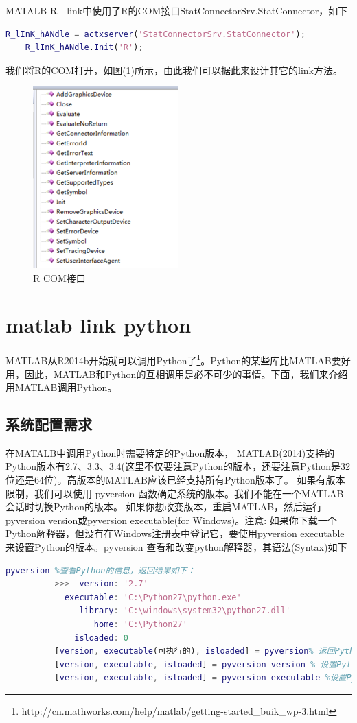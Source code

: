     MATALB R - link中使用了R的COM接口StatConnectorSrv.StatConnector，如下
    \begin{lstlisting}[language = Matlab]
    R_lInK_hANdle = actxserver('StatConnectorSrv.StatConnector');
    R_lInK_hANdle.Init('R');
    \end{lstlisting}
    我们将R的COM打开，如图(\ref{MATLAB-R接口})所示，由此我们可以据此来设计其它的link方法。
    \begin{figure}[H]
    \centering
    \includegraphics[height = 7cm]{images/MATLAB-Rjiekou.png}
    \caption{R COM接口}
    \label{MATLAB-R接口}
    \end{figure}

\section{matlab link python}
    \par
    MATLAB从R2014b开始就可以调用Python了\footnote{http://cn.mathworks.com/help/matlab/getting-started\_buik\_wp-3.html}。Python的某些库比MATLAB要好用，因此，MATLAB和Python的互相调用是必不可少的事情。下面，我们来介绍用MATLAB调用Python。
    \subsection{系统配置需求}
        \par
        在MATALB中调用Python时需要特定的Python版本， MATLAB(2014)支持的Python版本有2.7、3.3、3.4(这里不仅要注意Python的版本，还要注意Python是32位还是64位)。高版本的MATLAB应该已经支持所有Python版本了。 如果有版本限制，我们可以使用 pyversion 函数确定系统的版本。我们不能在一个MATLAB会话时切换Python的版本。 如果你想改变版本，重启MATLAB，然后运行pyversion version或pyversion executable(for Windows)。注意: 如果你下载一个Python解释器，但没有在Windows注册表中登记它，要使用pyversion executable来设置Python的版本。pyversion 查看和改变python解释器，其语法(Syntax)如下
        \begin{lstlisting}[language = Matlab]
          pyversion %查看Python的信息，返回结果如下：
          >>>  version: '2.7'
            executable: 'C:\Python27\python.exe'
               library: 'C:\windows\system32\python27.dll'
                  home: 'C:\Python27'
              isloaded: 0
          [version, executable(可执行的), isloaded] = pyversion% 返回Python的信息
          [version, executable, isloaded] = pyversion version % 设置Python的路径
          [version, executable, isloaded] = pyversion executable %设置Python的路径
        \end{lstlisting}

